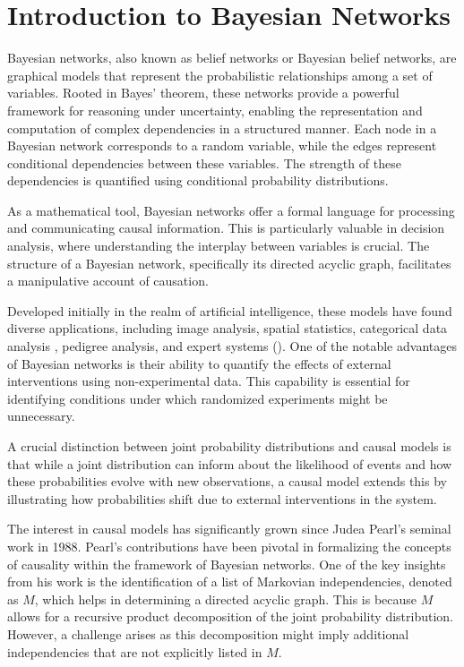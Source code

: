 \documentclass{report}
\begin{document}
\section{Introduction to Bayesian Networks}

Bayesian networks, also known as belief networks or Bayesian belief networks, are graphical models that represent the probabilistic relationships among a set of variables. Rooted in Bayes' theorem, these networks provide a powerful framework for reasoning under uncertainty, enabling the representation and computation of complex dependencies in a structured manner. Each node in a Bayesian network corresponds to a random variable, while the edges represent conditional dependencies between these variables. The strength of these dependencies is quantified using conditional probability distributions. 

As a mathematical tool, Bayesian networks offer a formal language for processing and communicating causal information. This is particularly valuable in decision analysis, where understanding the interplay between variables is crucial. The structure of a Bayesian network, specifically its directed acyclic graph, facilitates a manipulative account of causation.

Developed initially in the realm of artificial intelligence, these models have found diverse applications, including image analysis, spatial statistics, categorical data analysis , pedigree analysis, and expert systems (\citet{andersson1997markov}).
One of the notable advantages of Bayesian networks is their ability to quantify the effects of external interventions using non-experimental data. This capability is essential for identifying conditions under which randomized experiments might be unnecessary.      

A crucial distinction between joint probability distributions and causal models is that while a joint distribution can inform about the likelihood of events and how these probabilities evolve with new observations, a causal model extends this by illustrating how probabilities shift due to external interventions in the system. 

The interest in causal models has significantly grown since Judea Pearl's seminal work in 1988. Pearl's contributions have been pivotal in formalizing the concepts of causality within the framework of Bayesian networks. One of the key insights from his work is the identification of a list of Markovian independencies, denoted as $M$, which helps in determining a directed acyclic graph. This is because $M$ allows for a recursive product decomposition of the joint probability distribution. However, a challenge arises as this decomposition might imply additional independencies that are not explicitly listed in $M$. 
\end{document}
